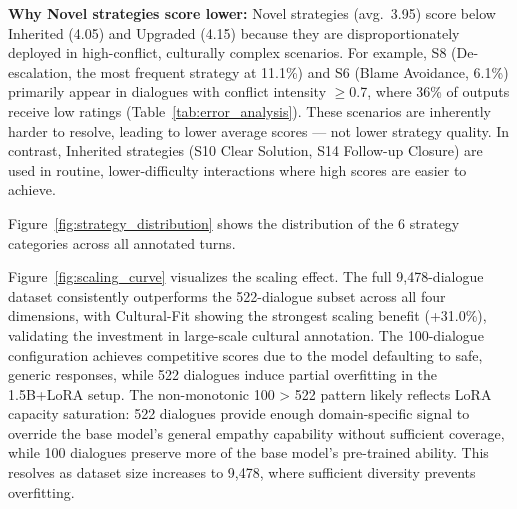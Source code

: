 \documentclass[11pt]{article}
\begin{document}
\begin{table}[t]
\textbf{Why Novel strategies score lower:} Novel strategies (avg.\ 3.95) score below Inherited (4.05) and Upgraded (4.15) because they are disproportionately deployed in high-conflict, culturally complex scenarios. For example, S8 (De-escalation, the most frequent strategy at 11.1\%) and S6 (Blame Avoidance, 6.1\%) primarily appear in dialogues with conflict intensity $\ge$0.7, where 36\% of outputs receive low ratings (Table~\ref{tab:error_analysis}). These scenarios are inherently harder to resolve, leading to lower average scores --- not lower strategy quality. In contrast, Inherited strategies (S10 Clear Solution, S14 Follow-up Closure) are used in routine, lower-difficulty interactions where high scores are easier to achieve.

Figure~\ref{fig:strategy_distribution} shows the distribution of the 6 strategy categories across all annotated turns.





Figure~\ref{fig:scaling_curve} visualizes the scaling effect. The full 9,478-dialogue dataset consistently outperforms the 522-dialogue subset across all four dimensions, with Cultural-Fit showing the strongest scaling benefit (+31.0\%), validating the investment in large-scale cultural annotation. The 100-dialogue configuration achieves competitive scores due to the model defaulting to safe, generic responses, while 522 dialogues induce partial overfitting in the 1.5B+LoRA setup. The non-monotonic 100 > 522 pattern likely reflects LoRA capacity saturation: 522 dialogues provide enough domain-specific signal to override the base model's general empathy capability without sufficient coverage, while 100 dialogues preserve more of the base model's pre-trained ability. This resolves as dataset size increases to 9,478, where sufficient diversity prevents overfitting.




\end{table}
\end{document}
